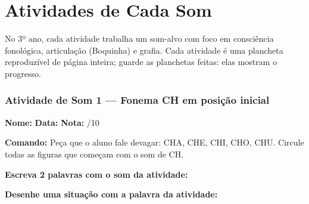 
\chapter{Atividades de Cada Som}

No 3º ano, cada atividade trabalha um som-alvo com foco em consciência fonológica, articulação (Boquinha) e grafia. Cada atividade é uma plancheta reproduzível de página inteira; guarde as planchetas feitas: elas mostram o progresso.



\subsection{Atividade de Som 1 --- Fonema CH em posição inicial}
\begin{exercicio}



\noindent\textbf{Nome:} \underline{\hspace{3.2cm}} \quad \textbf{Data:} \underline{\hspace{1.6cm}} \quad \textbf{Nota:} \underline{\hspace{0.9cm}}/10


\noindent\textbf{Comando:} Peça que o aluno fale devagar: CHA, CHE, CHI, CHO, CHU. Circule todas as figuras que começam com o som de CH.


\begin{center}
\end{center}

\noindent\textbf{Escreva 2 palavras com o som da atividade:}

\begin{center}
  \underline{\hspace{3cm}} \quad \underline{\hspace{3cm}}
\end{center}

\noindent\textbf{Desenhe uma situação com a palavra da atividade:}

\begin{center}
\end{center}

\end{exercicio}

